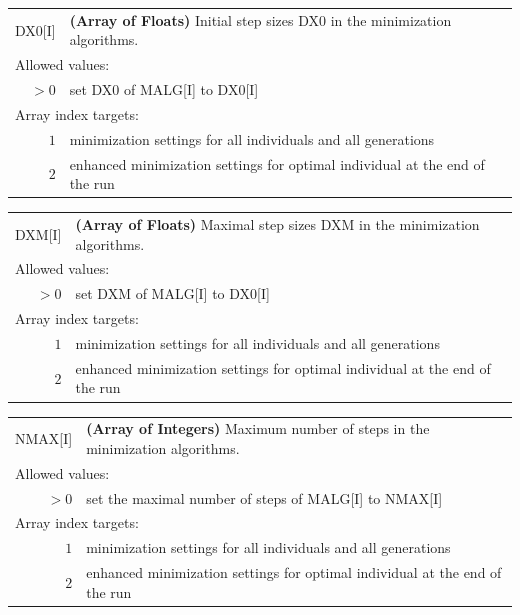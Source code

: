 \documentclass[10pt,a4paper]{report}
\numberwithin{equation}{section}
\begin{document}
{
\begin{tabular}{r@{ : }l}
\label{descr:dx0}
       DX0[I]&\textbf{(Array of Floats)} Initial step sizes DX0 in the minimization algorithms.                                               \\ 
\multicolumn{2}{l}{Allowed values:} \\ 
    \(>0\)&set DX0 of MALG[I] to DX0[I]                                                                         \\ 
\multicolumn{2}{l}{Array index targets:} \\ 
     \(1\)&minimization settings for all individuals and all generations \\
     \(2\)&enhanced minimization settings for optimal individual at the end of the run \\
\end{tabular}
\vspace{1ex}
}

{
\begin{tabular}{r@{ : }l}
\label{descr:dxm}
  DXM[I]&\textbf{(Array of Floats)} Maximal step sizes DXM in the minimization algorithms.                                               \\ 
\multicolumn{2}{l}{Allowed values:} \\ 
  \(>0\)&set DXM of MALG[I] to DX0[I]                                                                         \\ 
\multicolumn{2}{l}{Array index targets:} \\ 
  \(1\)&minimization settings for all individuals and all generations \\
  \(2\)&enhanced minimization settings for optimal individual at the end of the run \\
\end{tabular}
\vspace{1ex}
}

{
\begin{tabular}{r@{ : }l}
\label{descr:nmax}
      NMAX[I]&\textbf{(Array of Integers)} Maximum number of steps in the minimization algorithms.                                              \\ 
\multicolumn{2}{l}{Allowed values:} \\ 
    \(>0\)&set the maximal number of steps of MALG[I] to NMAX[I]                                                \\ 
\multicolumn{2}{l}{Array index targets:} \\ 
  \(1\)&minimization settings for all individuals and all generations \\
  \(2\)&enhanced minimization settings for optimal individual at the end of the run \\
\end{tabular}
\vspace{1ex}
}
\end{document}
